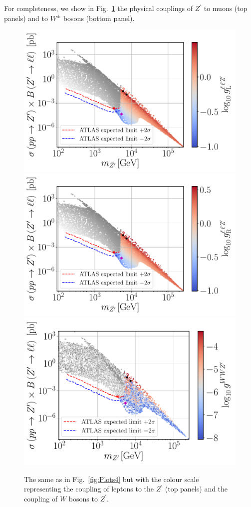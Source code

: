 \documentclass[a4paper,11pt]{article}
\renewcommand{\(}{\left(}
\renewcommand{\)}{\right)}
\renewcommand{\[}{\left[}
\renewcommand{\]}{\right]}
\begin{document}
For completeness, we show in Fig.~\ref{fig:Plots2} the physical couplings of $Z^\prime$ to muons (top panels) and to $W^\pm$ bosons (bottom panel).
\begin{figure}[!htb]
	\centering
	\includegraphics[scale=0.37]{mZp_Xsec_gLmumuZ.pdf}
	\includegraphics[scale=0.37]{mZp_Xsec_gRmumuZ.pdf}
	\includegraphics[scale=0.37]{mZp_Xsec_gWWZp.pdf}
	\caption{The same as in Fig.~\ref{fig:Plots4} but with the colour scale representing the coupling of leptons to the $Z^\prime$ (top panels) and the coupling of $W$ bosons to $Z^\prime$.}
	\label{fig:Plots2}
\end{figure}	
\end{document}
